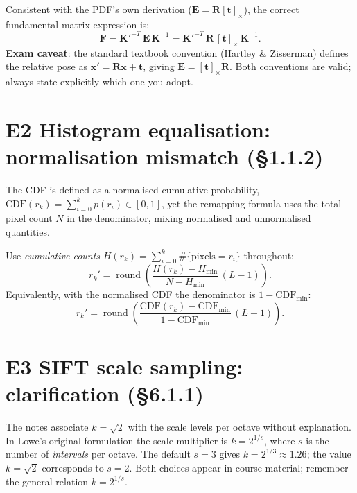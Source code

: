 \documentclass[12pt,a4paper]{report}
\newcommand{\vect}[1]{\mathbf{#1}}
\begin{document}
\begin{erratabox}
Consistent with the PDF's own derivation ($\vect{E} = \vect{R}[\vect{t}]_\times$),
the correct fundamental matrix expression is:
\[
    \vect{F} = \vect{K}'^{-T}\,\vect{E}\,\vect{K}^{-1}
             = \vect{K}'^{-T}\,\vect{R}\,[\vect{t}]_\times\,\vect{K}^{-1}.
\]
\textbf{Exam caveat}: the standard textbook convention (Hartley \& Zisserman)
defines the relative pose as $\vect{x}' = \vect{R}\vect{x} + \vect{t}$,
giving $\vect{E} = [\vect{t}]_\times\vect{R}$.  Both conventions are valid;
always state explicitly which one you adopt.
\end{erratabox}

\section*{E2 \quad Histogram equalisation: normalisation mismatch (\S 1.1.2)}

The CDF is defined as a normalised cumulative probability,
$\mathrm{CDF}(r_k)=\sum_{i=0}^{k}p(r_i)\in[0,1]$, yet the remapping formula
uses the total pixel count $N$ in the denominator, mixing normalised and
unnormalised quantities.

\begin{erratabox}
Use \emph{cumulative counts} $H(r_k)=\sum_{i=0}^{k}\#\{\text{pixels}=r_i\}$
throughout:
\[
    r_k' = \operatorname{round}\!\left(
        \frac{H(r_k)-H_{\min}}{N-H_{\min}}\,(L-1)
    \right).
\]
Equivalently, with the normalised CDF the denominator is
$1-\mathrm{CDF}_{\min}$:
\[
    r_k' = \operatorname{round}\!\left(
        \frac{\mathrm{CDF}(r_k)-\mathrm{CDF}_{\min}}{1-\mathrm{CDF}_{\min}}\,(L-1)
    \right).
\]
\end{erratabox}

\section*{E3 \quad SIFT scale sampling: clarification (\S 6.1.1)}

The notes associate $k=\sqrt{2}$ with the scale levels per octave without
explanation.  In Lowe's original formulation the scale multiplier is
$k = 2^{1/s}$, where $s$ is the number of \emph{intervals} per octave.
The default $s=3$ gives $k=2^{1/3}\approx 1.26$; the value $k=\sqrt{2}$
corresponds to $s=2$.  Both choices appear in course material; remember
the general relation $k = 2^{1/s}$.
\end{document}
